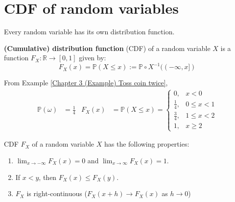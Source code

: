 \documentclass{huhtakm-template-book}
\newcommand{\prob}{\mathbb{P}}
\begin{document}
\section{CDF of random variables}
Every random variable has its own distribution function.
\begin{defn}
	\textbf{(Cumulative) distribution function} (CDF) of a random variable $X$ is a function $F_{X}:\mathbb{R}\to [0,1]$ given by:
	\begin{equation*}
		F_{X}(x)=\prob(X\leq x):=\prob\circ X^{-1}((-\infty,x])
	\end{equation*}
\end{defn}
\begin{eg}
	From Example \ref{Chapter 3 (Example) Toss coin twice},
	\begin{align*}
		\prob(\omega)&=\frac{1}{4} & F_{X}(x)&=\prob(X\leq x)=\begin{cases}
			0, &x<0\\
			\frac{1}{4}, &0\leq x<1\\
			\frac{3}{4}, &1\leq x<2\\
			1, &x\geq 2
		\end{cases}
	\end{align*}
\end{eg}
\begin{lem}
	CDF $F_{X}$ of a random variable $X$ has the following properties:
	\begin{enumerate}
		\item $\lim_{x\to -\infty}F_{X}(x)=0$ and $\lim_{x\to\infty}F_{X}(x)=1$.
		\item If $x<y$, then $F_{X}(x)\leq F_{X}(y)$.
		\item $F_{X}$ is right-continuous ($F_{X}(x+h)\to F_{X}(x)$ as $h\to 0$)
	\end{enumerate}
\end{lem}
\end{document}
